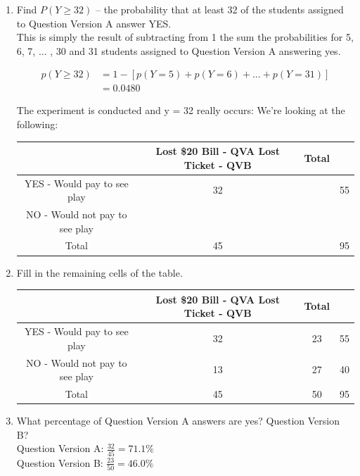 \documentclass{scrartcl}
\begin{document}
\begin{enumerate}
\item Find $P(Y \ge 32)$ – the probability that at least 32 of the students assigned to Question Version A answer YES.\\

  This is simply the result of subtracting from 1 the sum the probabilities for 5, 6, 7, ... , 30 and 31 students assigned to Question Version A answering yes.

\begin{align*}
  p(Y \ge 32) &= 1 - \left[p(Y = 5) + p(Y = 6) + ... + p(Y = 31)\right]\\
  &= 0.0480
\end{align*}
\pagebreak

The experiment is conducted and y = 32 really occurs: We’re looking at the following:

\begin{center}
\begin{tabular} { |c|c c|c| }
\hline
&Lost \$20 Bill -  QVA    Lost Ticket - QVB&Total\\
\hline
YES - Would pay to see play & 32 & & 55\\
NO - Would not pay to see play && &\\
\hline
Total & 45 && 95\\
\hline
\end{tabular}
\end{center}

\item Fill in the remaining cells of the table.

\begin{center}
\begin{tabular} { |c|c c|c| }
\hline
&Lost \$20 Bill -  QVA    Lost Ticket - QVB&Total\\
\hline
YES - Would pay to see play & 32 & 23 & 55\\
NO - Would not pay to see play & 13 & 27 & 40\\
\hline
Total & 45 & 50 & 95\\
\hline
\end{tabular}
\end{center}

\item What percentage of Question Version A answers are yes? Question Version B?\\

  Question Version A: $\frac{32}{45} = 71.1\%$\\
  Question Version B: $\frac{23}{50} = 46.0\%$\\


\end{enumerate}
\end{document}
